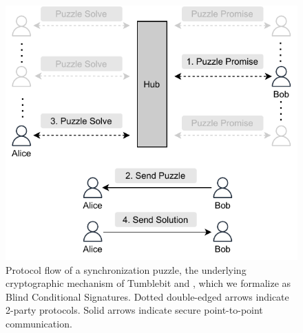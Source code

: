 \begin{figure}[htb]
    \centering
    \includegraphics[width=0.7\linewidth]{syncpuzzle.pdf}
    \caption{Protocol flow of a synchronization puzzle, the underlying cryptographic mechanism of Tumblebit and \AAL, which we formalize as Blind Conditional Signatures.
    Dotted double-edged arrows indicate 2-party protocols. Solid arrows indicate secure point-to-point communication.}
    \label{fig:syncpuzzle_overview}
  \end{figure}


